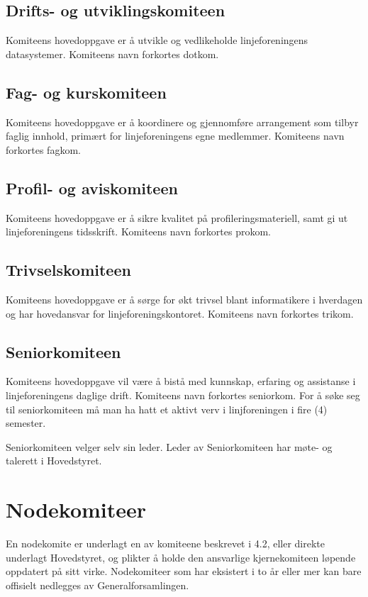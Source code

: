 \vspace{-10pt}
\subsection{Drifts- og utviklingskomiteen}{
Komiteens hovedoppgave er å utvikle og vedlikeholde linjeforeningens datasystemer. Komiteens navn forkortes dotkom.

}

\vspace{-10pt}
\subsection{Fag- og kurskomiteen}{
Komiteens hovedoppgave er å koordinere og gjennomføre arrangement som tilbyr faglig innhold, primært for linjeforeningens egne medlemmer. Komiteens navn forkortes fagkom.
}

\vspace{-10pt}
\subsection{Profil- og aviskomiteen}{
Komiteens hovedoppgave er å sikre kvalitet på profileringsmateriell, samt gi ut linjeforeningens tidsskrift. Komiteens navn forkortes prokom.
}

\vspace{-10pt}
\subsection{Trivselskomiteen}{
Komiteens hovedoppgave er å sørge for økt trivsel blant informatikere i hverdagen og har hovedansvar for linjeforeningskontoret. Komiteens navn forkortes trikom.
}

\vspace{-10pt}
\subsection{Seniorkomiteen}{
Komiteens hovedoppgave vil være å bistå med kunnskap, erfaring og assistanse i linjeforeningens daglige drift. Komiteens navn forkortes seniorkom. For å søke seg til seniorkomiteen må man ha hatt et aktivt verv i linjforeningen i fire (4) semester.					

Seniorkomiteen velger selv sin leder. Leder av Seniorkomiteen har møte- og talerett i Hovedstyret.
}

\section{Nodekomiteer}
\vspace{23pt}
En nodekomite er underlagt en av komiteene beskrevet i 4.2, eller direkte underlagt Hovedstyret, og plikter å holde den ansvarlige kjernekomiteen løpende oppdatert på sitt virke. Nodekomiteer som har eksistert i to år eller mer kan bare offisielt nedlegges av Generalforsamlingen.




